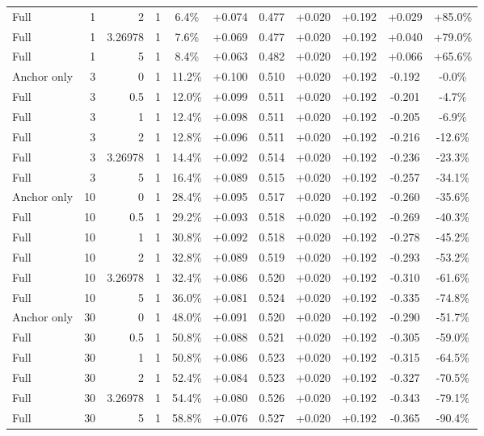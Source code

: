 \begin{table}[htbp]
\begin{tabular}{lrrrccccccc}
Full & 1 & 2 & 1 & 6.4\% & +0.074 & 0.477 & +0.020 & +0.192 & +0.029 & +85.0\% \\
Full & 1 & 3.26978 & 1 & 7.6\% & +0.069 & 0.477 & +0.020 & +0.192 & +0.040 & +79.0\% \\
Full & 1 & 5 & 1 & 8.4\% & +0.063 & 0.482 & +0.020 & +0.192 & +0.066 & +65.6\% \\
Anchor only & 3 & 0 & 1 & 11.2\% & +0.100 & 0.510 & +0.020 & +0.192 & -0.192 & -0.0\% \\
Full & 3 & 0.5 & 1 & 12.0\% & +0.099 & 0.511 & +0.020 & +0.192 & -0.201 & -4.7\% \\
Full & 3 & 1 & 1 & 12.4\% & +0.098 & 0.511 & +0.020 & +0.192 & -0.205 & -6.9\% \\
Full & 3 & 2 & 1 & 12.8\% & +0.096 & 0.511 & +0.020 & +0.192 & -0.216 & -12.6\% \\
Full & 3 & 3.26978 & 1 & 14.4\% & +0.092 & 0.514 & +0.020 & +0.192 & -0.236 & -23.3\% \\
Full & 3 & 5 & 1 & 16.4\% & +0.089 & 0.515 & +0.020 & +0.192 & -0.257 & -34.1\% \\
Anchor only & 10 & 0 & 1 & 28.4\% & +0.095 & 0.517 & +0.020 & +0.192 & -0.260 & -35.6\% \\
Full & 10 & 0.5 & 1 & 29.2\% & +0.093 & 0.518 & +0.020 & +0.192 & -0.269 & -40.3\% \\
Full & 10 & 1 & 1 & 30.8\% & +0.092 & 0.518 & +0.020 & +0.192 & -0.278 & -45.2\% \\
Full & 10 & 2 & 1 & 32.8\% & +0.089 & 0.519 & +0.020 & +0.192 & -0.293 & -53.2\% \\
Full & 10 & 3.26978 & 1 & 32.4\% & +0.086 & 0.520 & +0.020 & +0.192 & -0.310 & -61.6\% \\
Full & 10 & 5 & 1 & 36.0\% & +0.081 & 0.524 & +0.020 & +0.192 & -0.335 & -74.8\% \\
Anchor only & 30 & 0 & 1 & 48.0\% & +0.091 & 0.520 & +0.020 & +0.192 & -0.290 & -51.7\% \\
Full & 30 & 0.5 & 1 & 50.8\% & +0.088 & 0.521 & +0.020 & +0.192 & -0.305 & -59.0\% \\
Full & 30 & 1 & 1 & 50.8\% & +0.086 & 0.523 & +0.020 & +0.192 & -0.315 & -64.5\% \\
Full & 30 & 2 & 1 & 52.4\% & +0.084 & 0.523 & +0.020 & +0.192 & -0.327 & -70.5\% \\
Full & 30 & 3.26978 & 1 & 54.4\% & +0.080 & 0.526 & +0.020 & +0.192 & -0.343 & -79.1\% \\
Full & 30 & 5 & 1 & 58.8\% & +0.076 & 0.527 & +0.020 & +0.192 & -0.365 & -90.4\% \\

\end{tabular}
\end{table}
